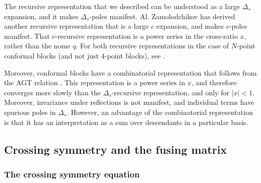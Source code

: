 \documentclass[12pt, a4paper, notitlepage, twoside]{report}
\numberwithin{equation}{section}
\theoremstyle{break}
\begin{document}
The recursive representation that we described can be understood as a large $\Delta_s$ expansion, and it makes $\Delta_s$-poles manifest. Al. Zamolodchikov has derived another recursive representation that is a large $c$ expansion, and makes $c$-poles manifest. That $c$-recursive representation is a power series in the cross-ratio $x$, rather than the nome $q$. For both recursive representations in the case of $N$-point conformal blocks (and not just $4$-point blocks), see \cite{ccy17}.

Moreover, conformal blocks have a combinatorial representation that follows from the AGT relation \cite{aflt10}. 
This representation is a power series in $x$, and therefore converges more slowly than the $\Delta_s$-recursive representation, and only for $|x|<1$.
Moreover, invariance under reflections is not manifest, and individual terms have spurious poles in $\Delta_s$.
However, an advantage of the combinatorial representation is that it has an interpretation as a sum over descendants in a particular basis.


\subsection{Crossing symmetry and the fusing matrix}

\subsubsection{The crossing symmetry equation}
\end{document}

